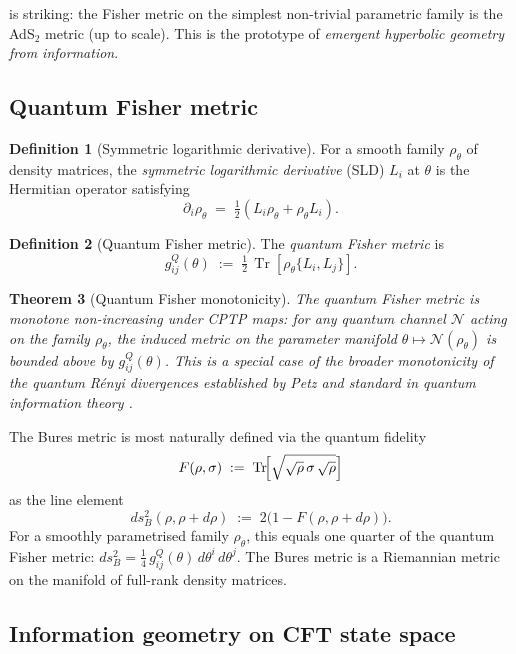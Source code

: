 \documentclass[12pt]{article}
\newtheorem{theorem}{Theorem}[section]
\theoremstyle{definition}
\newtheorem{definition}[theorem]{Definition}
\theoremstyle{remark}
\newcommand{\Tr}{\operatorname{Tr}}
\begin{document}
 is striking: the Fisher metric on the simplest non-trivial parametric family is the AdS$_2$ metric (up to scale). This is the prototype of \emph{emergent hyperbolic geometry from information}.

\subsection{Quantum Fisher metric}

\begin{definition}[Symmetric logarithmic derivative]
\label{def:sld}
For a smooth family $\rho_\theta$ of density matrices, the \emph{symmetric logarithmic derivative} (SLD) $L_i$ at $\theta$ is the Hermitian operator satisfying
\[
\partial_i \rho_\theta \;=\; \tfrac{1}{2}(L_i \rho_\theta + \rho_\theta L_i).
\]
\end{definition}

\begin{definition}[Quantum Fisher metric]
\label{def:qfm}
The \emph{quantum Fisher metric} is
\[
g^Q_{ij}(\theta) \;:=\; \tfrac{1}{2}\,\Tr\!\left[\rho_\theta\{L_i, L_j\}\right].
\]
\end{definition}

\begin{theorem}[Quantum Fisher monotonicity]
\label{thm:petz}
The quantum Fisher metric is monotone non-increasing under CPTP maps: for any quantum channel $\mathcal{N}$ acting on the family $\rho_\theta$, the induced metric on the parameter manifold $\theta \mapsto \mathcal{N}(\rho_\theta)$ is bounded above by $g^Q_{ij}(\theta)$. This is a special case of the broader monotonicity of the quantum R\'enyi divergences established by Petz \cite{petz1986} and standard in quantum information theory \cite{amari,nielsenchuang}.
\end{theorem}

The Bures metric is most naturally defined via the quantum fidelity
\[
F(\rho,\sigma) \;:=\; \Tr\!\Bigl[\sqrt{\sqrt{\rho}\,\sigma\,\sqrt{\rho}}\Bigr]
\]
as the line element
\[
ds_B^2(\rho,\rho + d\rho) \;:=\; 2\bigl(1 - F(\rho,\rho+d\rho)\bigr).
\]
For a smoothly parametrised family $\rho_\theta$, this equals one quarter of the quantum Fisher metric: $ds_B^2 = \tfrac{1}{4}\,g^Q_{ij}(\theta)\,d\theta^i\,d\theta^j$. The Bures metric is a Riemannian metric on the manifold of full-rank density matrices.

\subsection{Information geometry on CFT state space}
\end{document}
